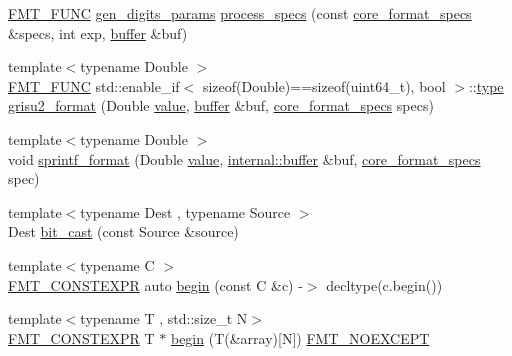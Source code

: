 \begin{DoxyCompactItemize}
\item 
\hyperlink{format_8h_a02c8898388e0ae59aab58be14fcd4e05}{F\+M\+T\+\_\+\+F\+U\+NC} \hyperlink{structinternal_1_1gen__digits__params}{gen\+\_\+digits\+\_\+params} \hyperlink{namespaceinternal_ae7e379764ed4a98f3058130ffbca218a}{process\+\_\+specs} (const \hyperlink{structcore__format__specs}{core\+\_\+format\+\_\+specs} \&specs, int exp, \hyperlink{namespaceinternal_a5fcdbc3efad1f390e6c3f0fdafa56122}{buffer} \&buf)
\item 
{\footnotesize template$<$typename Double $>$ }\\\hyperlink{format_8h_a02c8898388e0ae59aab58be14fcd4e05}{F\+M\+T\+\_\+\+F\+U\+NC} std\+::enable\+\_\+if$<$ sizeof(Double)==sizeof(uint64\+\_\+t), bool $>$\+::\hyperlink{namespaceinternal_a8661864098ac0acff9a6dd7e66f59038}{type} \hyperlink{namespaceinternal_a2cba199f690b1f46cbf62c8e9e2786bc}{grisu2\+\_\+format} (Double \hyperlink{classinternal_1_1value}{value}, \hyperlink{namespaceinternal_a5fcdbc3efad1f390e6c3f0fdafa56122}{buffer} \&buf, \hyperlink{structcore__format__specs}{core\+\_\+format\+\_\+specs} specs)
\item 
{\footnotesize template$<$typename Double $>$ }\\void \hyperlink{namespaceinternal_a13d861df4fe01615dc7cb28d77e839e4}{sprintf\+\_\+format} (Double \hyperlink{classinternal_1_1value}{value}, \hyperlink{namespaceinternal_a5fcdbc3efad1f390e6c3f0fdafa56122}{internal\+::buffer} \&buf, \hyperlink{structcore__format__specs}{core\+\_\+format\+\_\+specs} spec)
\item 
{\footnotesize template$<$typename Dest , typename Source $>$ }\\Dest \hyperlink{namespaceinternal_a838eb80d80234b98b1d95827f881af92}{bit\+\_\+cast} (const Source \&source)
\item 
{\footnotesize template$<$typename C $>$ }\\\hyperlink{core_8h_a69201cb276383873487bf68b4ef8b4cd}{F\+M\+T\+\_\+\+C\+O\+N\+S\+T\+E\+X\+PR} auto \hyperlink{namespaceinternal_a265f36d9dee68d3f44381347ef2fd5cb}{begin} (const C \&c) -\/$>$ decltype(c.\+begin())
\item 
{\footnotesize template$<$typename T , std\+::size\+\_\+t N$>$ }\\\hyperlink{core_8h_a69201cb276383873487bf68b4ef8b4cd}{F\+M\+T\+\_\+\+C\+O\+N\+S\+T\+E\+X\+PR} T $\ast$ \hyperlink{namespaceinternal_a0567295d80d8401a11f91260284cd62e}{begin} (T(\&array)\mbox{[}N\mbox{]}) \hyperlink{core_8h_aef128913e8400683b1cbd1a3a2e11df3}{F\+M\+T\+\_\+\+N\+O\+E\+X\+C\+E\+PT}

\end{DoxyCompactItemize}
